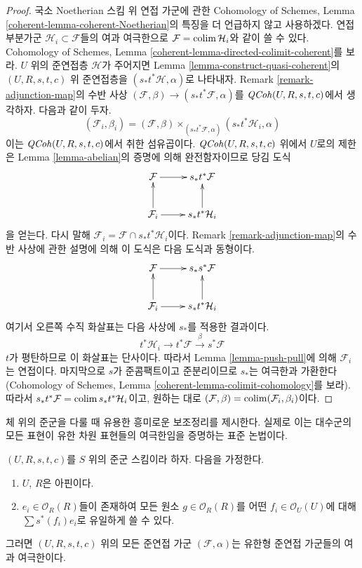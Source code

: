 \begin{proof}
국소 Noetherian 스킴 위 연접 가군에 관한 Cohomology of Schemes, Lemma
\ref{coherent-lemma-coherent-Noetherian}의 특징을 더 언급하지 않고 사용하겠다. 연접 부분가군
$\mathcal{H}_i \subset \mathcal{F}$들의 여과 여극한으로 $\mathcal{F} = \mathop{\mathrm{colim}}\nolimits \mathcal{H}_i$와 같이 쓸 수 있다.
Cohomology of Schemes, Lemma \ref{coherent-lemma-directed-colimit-coherent}를 보라. $U$ 위의 준연접층 $\mathcal{H}$가
주어지면 Lemma \ref{lemma-construct-quasi-coherent}의 $(U, R, s, t, c)$ 위 준연접층을
$(s_*t^*\mathcal{H}, \alpha)$로 나타내자. Remark \ref{remark-adjunction-map}의 수반 사상
$(\mathcal{F}, \beta) \to (s_*t^*\mathcal{F}, \alpha)$를 $\mathit{QCoh}(U, R, s, t, c)$에서 생각하자.
다음과 같이 두자.
$$
(\mathcal{F}_i, \beta_i) =
(\mathcal{F}, \beta)
\times_{(s_*t^*\mathcal{F}, \alpha)}
(s_*t^*\mathcal{H}_i, \alpha)
$$
이는 $\mathit{QCoh}(U, R, s, t, c)$에서 취한 섬유곱이다. $\mathit{QCoh}(U, R, s, t, c)$ 위에서 $U$로의 제한은
Lemma \ref{lemma-abelian}의 증명에 의해 완전함자이므로 당김 도식
$$
\xymatrix{
\mathcal{F} \ar[r] & s_*t^*\mathcal{F} \\
\mathcal{F}_i \ar[r] \ar[u] & s_*t^*\mathcal{H}_i \ar[u]
}
$$
을 얻는다. 다시 말해 $\mathcal{F}_i = \mathcal{F} \cap s_*t^*\mathcal{H}_i$이다. Remark
\ref{remark-adjunction-map}의 수반 사상에 관한 설명에 의해 이 도식은 다음 도식과 동형이다.
$$
\xymatrix{
\mathcal{F} \ar[r] & s_*s^*\mathcal{F} \\
\mathcal{F}_i \ar[r] \ar[u] & s_*t^*\mathcal{H}_i \ar[u]
}
$$
여기서 오른쪽 수직 화살표는 다음 사상에 $s_*$를 적용한 결과이다.
$$
t^*\mathcal{H}_i \to t^*\mathcal{F} \xrightarrow{\beta} s^*\mathcal{F}
$$
$t$가 평탄하므로 이 화살표는 단사이다. 따라서 Lemma \ref{lemma-push-pull}에 의해 $\mathcal{F}_i$는 연접이다.
마지막으로 $s$가 준콤팩트이고 준분리이므로 $s_*$는 여극한과 가환한다(Cohomology of Schemes, Lemma
\ref{coherent-lemma-colimit-cohomology}를 보라). 따라서 $s_*t^*\mathcal{F} = \mathop{\mathrm{colim}}\nolimits s_*t^*\mathcal{H}_i$이고,
원하는 대로 $(\mathcal{F}, \beta) = \mathop{\mathrm{colim}}\nolimits (\mathcal{F}_i, \beta_i)$이다.
\end{proof}

\noindent
체 위의 준군을 다룰 때 유용한 흥미로운 보조정리를 제시한다. 실제로 이는 대수군의 모든 표현이 유한 차원 표현들의
여극한임을 증명하는 표준 논법이다.

\begin{lemma}
\label{lemma-colimit-finite-type}
$(U, R, s, t, c)$를 $S$ 위의 준군 스킴이라 하자. 다음을 가정한다.
\begin{enumerate}
\item $U$, $R$은 아핀이다.
\item $e_i \in \mathcal{O}_R(R)$들이 존재하여 모든 원소 $g \in \mathcal{O}_R(R)$를
어떤 $f_i \in \mathcal{O}_U(U)$에 대해 $\sum s^*(f_i)e_i$로 유일하게 쓸 수 있다.
\end{enumerate}
그러면 $(U, R, s, t, c)$ 위의 모든 준연접 가군 $(\mathcal{F}, \alpha)$는 유한형 준연접 가군들의 여과 여극한이다.
\end{lemma}

